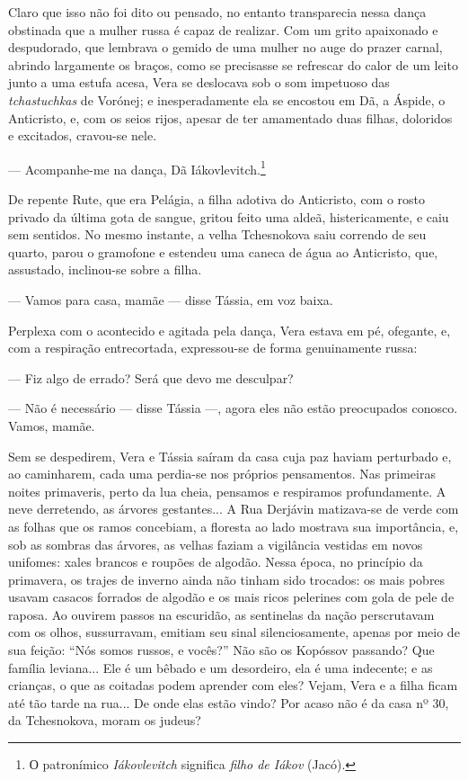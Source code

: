 Claro que isso não foi dito ou pensado, no entanto transparecia nessa
dança obstinada que a mulher russa é capaz de realizar. Com um grito
apaixonado e despudorado, que lembrava o gemido de uma mulher no auge do
prazer carnal, abrindo largamente os braços, como se precisasse se
refrescar do calor de um leito junto a uma estufa acesa, Vera se
deslocava sob o som impetuoso das \emph{tchastuchkas} de Vorónej; e
inesperadamente ela se encostou em Dã, a Áspide, o Anticristo, e, com os
seios rijos, apesar de ter amamentado duas filhas, doloridos e
excitados, cravou-se nele.

--- Acompanhe-me na dança, Dã Iákovlevitch.\footnote{О patronímico
  \emph{Iákovlevitch} significa \emph{filho de Iákov} (Jacó).}

De repente Rute, que era Pelágia, a filha adotiva do Anticristo, com o
rosto privado da última gota de sangue, gritou feito uma aldeã,
histericamente, e caiu sem sentidos. No mesmo instante, a velha
Tchesnokova saiu correndo de seu quarto, parou o gramofone e estendeu
uma caneca de água ao Anticristo, que, assustado, inclinou-se sobre a
filha.

--- Vamos para casa, mamãe --- disse Tássia, em voz baixa.

Perplexa com o acontecido e agitada pela dança, Vera estava em pé,
ofegante, e, com a respiração entrecortada, expressou-se de forma
genuinamente russa:

--- Fiz algo de errado? Será que devo me desculpar?

--- Não é necessário --- disse Tássia ---, agora eles não estão
preocupados conosco. Vamos, mamãe.

Sem se despedirem, Vera e Tássia saíram da casa cuja paz haviam
perturbado e, ao caminharem, cada uma perdia-se nos próprios
pensamentos. Nas primeiras noites primaveris, perto da lua cheia,
pensamos e respiramos profundamente. A neve derretendo, as árvores
gestantes... A Rua Derjávin matizava-se de verde com as folhas que os
ramos concebiam, a floresta ao lado mostrava sua importância, e, sob as
sombras das árvores, as velhas faziam a vigilância vestidas em novos
unifomes: xales brancos e roupões de algodão. Nessa época, no princípio
da primavera, os trajes de inverno ainda não tinham sido trocados: os
mais pobres usavam casacos forrados de algodão e os mais ricos pelerines
com gola de pele de raposa. Ao ouvirem passos na escuridão, as
sentinelas da nação perscrutavam com os olhos, sussurravam, emitiam seu
sinal silenciosamente, apenas por meio de sua feição: ``Nós somos
russos, e vocês?'' Não são os Kopóssov passando? Que família leviana...
Ele é um bêbado e um desordeiro, ela é uma indecente; e as crianças, o
que as coitadas podem aprender com eles? Vejam, Vera e a filha ficam até
tão tarde na rua... De onde elas estão vindo? Por acaso não é da casa nº
30, da Tchesnokova, moram os judeus?

